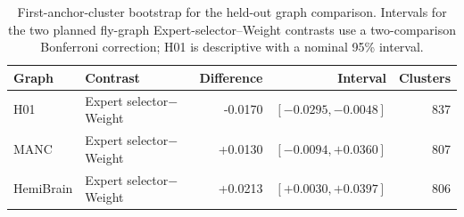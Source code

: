 \begin{table}[h]
\centering\scriptsize
\setlength{\tabcolsep}{3pt}
\caption{First-anchor-cluster bootstrap for the held-out graph comparison. Intervals for the two planned fly-graph Expert-selector--Weight contrasts use a two-comparison Bonferroni correction; H01 is descriptive with a nominal 95\% interval.}
\label{tab:cluster-bootstrap}
\begin{tabular}{llrrr}
\toprule
Graph & Contrast & Difference & Interval & Clusters \\
\midrule
H01 & Expert selector$-$Weight & -0.0170 & $[-0.0295,-0.0048]$ & 837 \\
MANC & Expert selector$-$Weight & +0.0130 & $[-0.0094,+0.0360]$ & 807 \\
HemiBrain & Expert selector$-$Weight & +0.0213 & $[+0.0030,+0.0397]$ & 806 \\
\bottomrule
\end{tabular}
\end{table}
